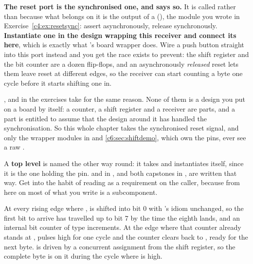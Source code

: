 \begin{aside}
\textbf{The reset port is the synchronised one, and  says so.} It is called
 rather than  because what belongs on it is the output of a
 (), the module you wrote in
Exercise~\ref{c4:ex:resetsync}: assert asynchronously, release synchronously. \textbf{Instantiate
one in the design wrapping this receiver and connect its  here}, which is exactly
what 's board wrapper does. Wire a push button straight into this port
instead and you get the race  exists to prevent: the shift register and the bit
counter are a dozen flip-flops, and an asynchronously \emph{released} reset lets them leave reset at
different edges, so the receiver can start counting a byte one cycle before it starts shifting one
in.

,  and  in the exercises take  for the same
reason. None of them is a design you put on a board by itself: a counter, a shift register and a
receiver are parts, and a part is entitled to assume that the design around it has handled the
synchronisation. So this whole chapter takes the synchronised reset signal, and only the wrapper
modules in  and \ref{c6:sec:shiftdemo}, which own the pins, ever see a raw
.

A \textbf{top level} is named the other way round: it takes  and instantiates
 itself, since it is the one holding the pin.  and
 in , and both capstones in , are written that way.
Get into the habit of reading  as a requirement on the caller, because from here on most
of what you write is a subcomponent.
\end{aside}


At every rising edge where ,  is shifted into bit 0 with
's idiom unchanged, so the first bit to arrive has travelled up to bit 7 by the
time the eighth lands, and an internal bit counter of type  increments.
At the edge where that counter already stands at ,  pulses high for one
cycle and the counter clears back to , ready for the next byte.  is driven by
a concurrent assignment from the shift register, so the complete byte is on it during the cycle
where  is high.

